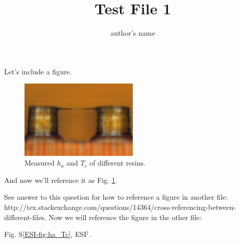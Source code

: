 \documentclass[12pt]{article}
\title{Test File 1}
\author{author's name}
\date{}
\begin{document}
\maketitle

Let's include a figure.

\begin{figure}[!h]
\centering
  \includegraphics[width=0.5\textwidth]{10um_memb.png}
  \caption{Measured $h_a$ and $T_c$ of different resins. }
  \label{fig:10um_memb}
\end{figure}

And now we'll reference it as Fig. \ref{fig:10um_memb}.

See answer to this question for how to reference a figure in another file: http://tex.stackexchange.com/questions/14364/cross-referencing-between-different-files. Now we will reference the figure in the other file:

Fig. S\ref{ESI-fig:ha_Tc}, ESI$^\dag$.
\end{document}
